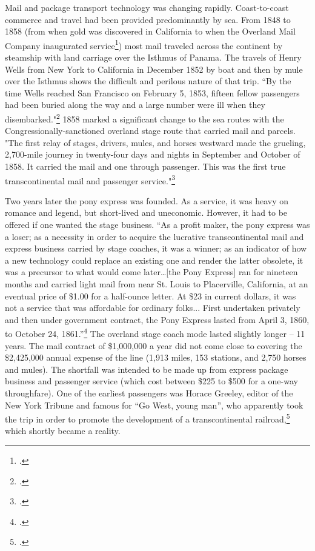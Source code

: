 Mail and package transport technology was changing rapidly. Coast-to-coast commerce and travel had been provided predominantly by sea. From 1848 to 1858 (from when gold was discovered in California to when the Overland Mail Company inaugurated service\footcite{sfmuseum}) most mail traveled across the continent by steamship with land carriage over the Isthmus of Panama. The travels of Henry Wells from New York to California in December 1852 by boat and then by mule over the Isthmus shows the difficult and perilous nature of that trip.  “By the time Wells reached San Francisco on February 5, 1853, fifteen fellow passengers had been buried along the way and a large number were ill when they disembarked."\footcite{Stagcoach} 1858 marked a significant change to the sea routes with the Congressionally-sanctioned overland stage route that carried mail and parcels. "The first relay of stages, drivers, mules, and horses westward made the grueling, 2,700-mile journey in twenty-four days and nights in September and October of 1858.  It carried the mail and one through passenger.  This was the first true transcontinental mail and passenger service."\footcite{Stagcoach}

Two years later the pony express was founded.  As a service, it was heavy on romance and legend, but short-lived and uneconomic. However, it had to be offered if one wanted the stage business.  “As a profit maker, the pony express was a loser; as a necessity in order to acquire the lucrative transcontinental mail and express business carried by stage coaches, it was a winner; as an indicator of how a new technology could replace an existing one and render the latter obsolete, it was a precursor to what would come later…[the Pony Express] ran for nineteen months and carried light mail from near St. Louis to Placerville, California, at an eventual price of \$1.00 for a half-ounce letter.  At \$23 in current dollars, it was not a service that was affordable for ordinary folks... First undertaken privately and then under government contract, the Pony Express lasted from April 3, 1860, to October 24, 1861.”\footcite{Stagcoach} The overland stage coach mode lasted slightly longer – 11 years.  The mail contract of \$1,000,000 a year did not come close to covering the \$2,425,000 annual expense of the line (1,913 miles, 153 stations, and 2,750 horses and mules).  The shortfall was intended to be made up from express package business and passenger service (which cost between \$225 to \$500 for a one-way throughfare). One of the earliest passengers was Horace Greeley, editor of the New York Tribune and famous for “Go West, young man”, who apparently took the trip in order to promote the development of a transcontinental railroad,\footcite{Stagcoach} which shortly became a reality.

